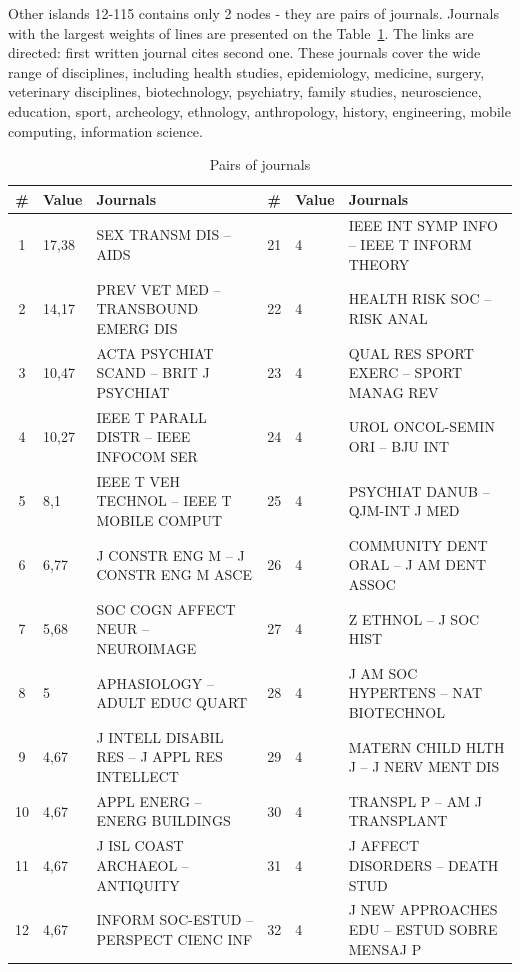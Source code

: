 \documentclass[11pt]{article} %
\begin{document}

Other islands 12-115 contains only 2 nodes - they are pairs of journals. Journals with the largest weights of lines are presented on the Table~\ref{jpairs}. The links are directed: first written journal cites second one. These journals cover the wide range of disciplines, including health studies, epidemiology, medicine, surgery, veterinary disciplines, biotechnology, psychiatry, family studies, neuroscience, education, sport, archeology, ethnology, anthropology, history, engineering, mobile computing, information science.  

\begin{table}
\caption{Pairs of journals} \label{jpairs}\medskip
\renewcommand{\arraystretch}{0.9}
\small
\begin{tabular}{c|l|p{6cm}||c|l|p{6cm}|}
\# &	Value&	Journals &	\# &	Value&	Journals \\  \hline 
1&	17,38&	SEX TRANSM DIS --  AIDS       &	21&	4&	IEEE INT SYMP INFO --  IEEE T INFORM THEORY   \\
2&	14,17&	PREV VET MED --  TRANSBOUND EMERG DIS     &	22&	4&	HEALTH RISK SOC --  RISK ANAL      \\
3&	10,47&	ACTA PSYCHIAT SCAND --  BRIT J PSYCHIAT     &	23&	4&	QUAL RES SPORT EXERC --  SPORT MANAG REV    \\
4&	10,27&	IEEE T PARALL DISTR --  IEEE INFOCOM SER    &	24&	4&	UROL ONCOL-SEMIN ORI --  BJU INT      \\
5&	8,1&	IEEE T VEH TECHNOL --  IEEE T MOBILE COMPUT   &	25&	4&	PSYCHIAT DANUB --  QJM-INT J MED      \\
6&	6,77&	J CONSTR ENG M --  J CONSTR ENG M ASCE  &	26&	4&	COMMUNITY DENT ORAL --  J AM DENT ASSOC    \\
7&	5,68&	SOC COGN AFFECT NEUR --  NEUROIMAGE      &	27&	4&	Z ETHNOL --  J SOC HIST      \\
8&	5&	APHASIOLOGY --  ADULT EDUC QUART       &	28&	4&	J AM SOC HYPERTENS --  NAT BIOTECHNOL     \\
9&	4,67&	J INTELL DISABIL RES --  J APPL RES INTELLECT   &	29&	4&	MATERN CHILD HLTH J --  J NERV MENT DIS   \\
10&	4,67&	APPL ENERG --  ENERG BUILDINGS       &	30&	4&	TRANSPL P --  AM J TRANSPLANT      \\
11&	4,67&	J ISL COAST ARCHAEOL --  ANTIQUITY      &	31&	4&	J AFFECT DISORDERS --  DEATH STUD      \\
12&	4,67&	INFORM SOC-ESTUD --  PERSPECT CIENC INF      &	32&	4&	J NEW APPROACHES EDU --  ESTUD SOBRE MENSAJ P   \\

\end{tabular}
\end{table}
\end{document}
